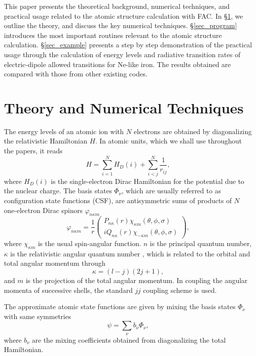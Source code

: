\documentclass{elsart}
\begin{document}
This paper presents the theoretical background, numerical techniques, and
practical usage related to the atomic structure calculation with FAC. In
\S\ref{sec_theory}, we outline the theory, and discuss the key numerical
techniques. \S\ref{sec_program} introduces the most important routines
relevant to the atomic structure calculation. \S\ref{sec_example} presents a step by step demonstration of the 
practical usage through the calculation of energy levels and radiative
transition rates of electric-dipole allowed transitions for Ne-like iron. The
results obtained are compared with those from other existing codes. 

\section{Theory and Numerical Techniques}
\label{sec_theory}
The energy levels of an atomic ion with $N$ electrons are obtained by
diagonalizing the relativistic Hamiltonian $H$. In atomic units, which we shall
use throughout the papers, it reads
\begin{equation}
\label{eq_hamilton}
H = \sum_{i=1}^{N} H_{D}(i) + \sum_{i<j}^{N}\frac{1}{r_{ij}},
\end{equation}
where $H_{D}(i)$ is the single-electron Dirac Hamiltonian for the potential
due to the nuclear charge. The basis states $\Phi_{\nu}$, which are usually
referred to as configuration state functions (CSF), are antisymmetric sums of
products of $N$ one-electron Dirac spinors $\varphi_{n\kappa m}$
\begin{equation}
\label{eq_spinor}
\varphi_{n\kappa m} = \frac{1}{r}\left(\begin{array}{c}
P_{n\kappa}(r) \chi_{\kappa m}(\theta, \phi, \sigma)\\
iQ_{n\kappa}(r) \chi_{-\kappa m}(\theta, \phi, \sigma)
\end{array}\right),
\end{equation}
where $\chi_{\kappa m}$ is the usual spin-angular function. $n$ is the
principal quantum number, $\kappa$ is the relativistic angular quantum number
, which is related to the orbital and total angular momentum through
\begin{equation}
\kappa = (l-j)(2j+1),
\end{equation}
and $m$ is the projection of the total angular momentum. In coupling the
angular momenta of successive shells, the standard $jj$ coupling scheme is
used. 

The approximate atomic state functions are given by mixing the basis
states $\Phi_{\nu}$ with same symmetries
\begin{equation}
\label{eq_asf}
\psi = \sum_{\nu} b_{\nu} \Phi_{\nu},
\end{equation}
where $b_{\nu}$ are the mixing coefficients obtained from diagonalizing the
total Hamiltonian. 
\end{document}
